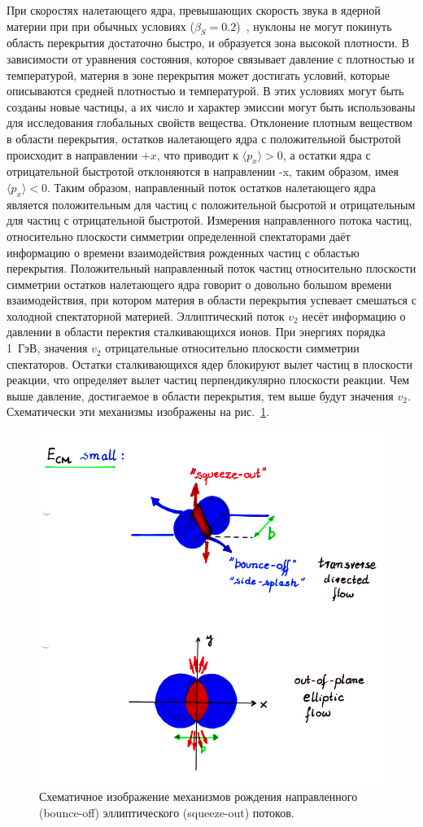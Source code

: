 При скоростях налетающего ядра, превышающих скорость звука в ядерной материи при при обычных условиях ($\beta_S=0.2$)~\cite{Weber:1998aa}, нуклоны не могут покинуть область перекрытия достаточно быстро, и образуется зона высокой плотности.
В зависимости от уравнения состояния, которое связывает давление с плотностью и температурой, материя в зоне перекрытия может достигать условий, которые описываются средней плотностью и температурой.
В этих условиях могут быть созданы новые частицы, а их число и характер эмиссии могут быть использованы для исследования глобальных свойств вещества.
Отклонение плотным веществом в области перекрытия, остатков налетающего ядра с положительной быстротой происходит в направлении $+x$, что приводит к $\langle p_x \rangle  > 0$, а остатки ядра с отрицательной быстротой отклоняются в направлении -x, таким образом, имея $\langle p_x \rangle < 0$.
Таким образом, направленный поток остатков налетающего ядра является положительным для частиц с положительной бысротой и отрицательным для частиц с отрицательной быстротой.
Измерения направленного потока частиц, относительно плоскости симметрии определенной спектаторами даёт информацию о времени взаимодействия рожденных частиц с областью перекрытия.
Положительный направленный поток частиц относительно плоскости симметрии остатков налетающего ядра говорит о довольно большом времени взаимодействия, при котором материя в области перекрытия успевает смешаться с холодной спектаторной материей.
Эллиптический поток $v_2$ несёт информацию о давлении в области перектия сталкивающихся ионов.
При энергиях порядка 1~ГэВ, значения $v_2$ отрицательные относительно плоскости симметрии спектаторов.
Остатки сталкивающихся ядер блокируют вылет частиц в плоскости реакции, что определяет вылет частиц перпендикулярно плоскости реакции.
Чем выше давление, достигаемое в области перекрытия, тем выше будут значения $v_2$.
Схематически эти механизмы изображены на рис.~\ref{fig:bounce_off}.
%
\begin{figure}[ht]
\begin{center}
    \includegraphics[width=0.75\linewidth]{images/bounce_off.jpg}
    \caption{Схематичное изображение механизмов рождения направленного (bounce-off) эллиптического (squeeze-out) потоков.}
    \label{fig:bounce_off}
\end{center}
\end{figure}
%

